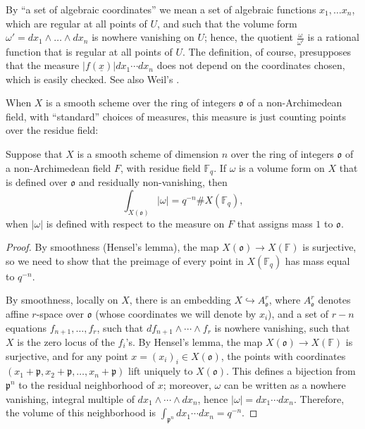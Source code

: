 By ``a set of algebraic coordinates'' we mean a set of algebraic functions $x_1, \dots x_n$, which are regular at all points of $U$, and such that the volume form $\omega'=dx_1 \wedge \dots \wedge dx_n$ is nowhere vanishing on $U$; hence, the quotient $\frac{\omega}{\omega'}$ is a rational function that is regular at all points of $U$. The definition, of course, presupposes that the measure $|f(\underline x)| dx_1 \cdots dx_n$ does not depend on the coordinates chosen, which is easily checked. See also Weil's \cite{Weil-adeles}.

When $X$ is a smooth scheme over the ring of integers $\mathfrak o$ of a non-Archimedean field, with ``standard'' choices of measures, this measure is just counting points over the residue field:

\begin{lemma}
 \label{lemma-integral-pointcounting}
Suppose that $X$ is a smooth scheme of dimension $n$ over the ring of integers $\mathfrak o$ of a non-Archimedean field $F$, with residue field $\mathbb F_q$. If $\omega$ is a volume form on $X$ that is defined over $\mathfrak o$ and residually non-vanishing, then 
$$ \int_{X(\mathfrak o)} |\omega| = q^{-n} \# X(\mathbb F_q),$$
when $|\omega|$ is defined with respect to the measure on $F$ that assigns mass $1$ to $\mathfrak o$.
\end{lemma}


\begin{proof}
 By smoothness (Hensel's lemma), the map $X(\mathfrak o)\to X(\mathbb F)$ is surjective, so we need to show that the preimage of every point in $X(\mathbb F_q)$ has mass equal to $q^{-n}$. 

 By smoothness, locally on $X$, there is an embedding $X \hookrightarrow A_{\mathfrak o}^r$, where $A_{\mathfrak o}^r$ denotes affine $r$-space over $\mathfrak o$ (whose coordinates we will denote by $x_i$), and a set of $r-n$ equations $f_{n+1}, \dots,  f_{r}$, such that $df_{n+1}\wedge \cdots \wedge f_r$ is nowhere vanishing, such that $X$ is the zero locus of the $f_i$'s. By Hensel's lemma, the map $X(\mathfrak o)\to X(\mathbb F)$ is surjective, and for any point $x = (x_i)_i \in X(\mathfrak o)$, the points with coordinates $(x_1+\mathfrak p, x_2+\mathfrak p, \dots, x_n+\mathfrak p)$ lift uniquely to $X(\mathfrak o)$. This defines a bijection from $\mathfrak p^n$ to the residual neighborhood of $x$; moreover, $\omega$ can be written as a nowhere vanishing, integral multiple of $dx_1 \wedge \cdots \wedge dx_n$, hence $|\omega| = dx_1 \cdots dx_n$. Therefore, the volume of this neighborhood is $\int_{\mathfrak p^n} dx_1 \cdots dx_n = q^{-n}$.
\end{proof}


